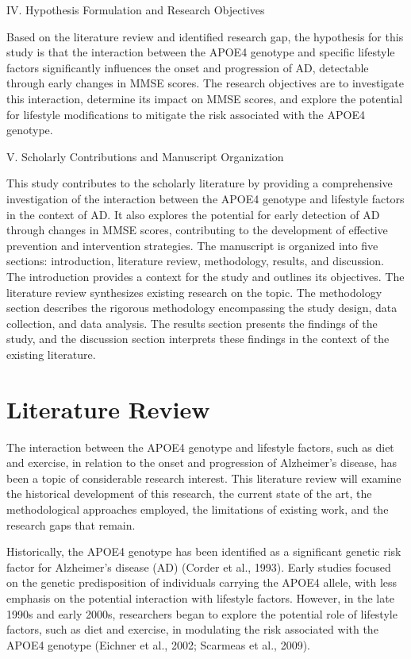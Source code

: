 \documentclass[conference]{IEEEtran}
\begin{document}
IV. Hypothesis Formulation and Research Objectives

Based on the literature review and identified research gap, the hypothesis for this study is that the interaction between the APOE4 genotype and specific lifestyle factors significantly influences the onset and progression of AD, detectable through early changes in MMSE scores. The research objectives are to investigate this interaction, determine its impact on MMSE scores, and explore the potential for lifestyle modifications to mitigate the risk associated with the APOE4 genotype.

V. Scholarly Contributions and Manuscript Organization

This study contributes to the scholarly literature by providing a comprehensive investigation of the interaction between the APOE4 genotype and lifestyle factors in the context of AD. It also explores the potential for early detection of AD through changes in MMSE scores, contributing to the development of effective prevention and intervention strategies. The manuscript is organized into five sections: introduction, literature review, methodology, results, and discussion. The introduction provides a context for the study and outlines its objectives. The literature review synthesizes existing research on the topic. The methodology section describes the rigorous methodology encompassing the study design, data collection, and data analysis. The results section presents the findings of the study, and the discussion section interprets these findings in the context of the existing literature.

\section{Literature Review}
The interaction between the APOE4 genotype and lifestyle factors, such as diet and exercise, in relation to the onset and progression of Alzheimer's disease, has been a topic of considerable research interest. This literature review will examine the historical development of this research, the current state of the art, the methodological approaches employed, the limitations of existing work, and the research gaps that remain.

Historically, the APOE4 genotype has been identified as a significant genetic risk factor for Alzheimer's disease (AD) (Corder et al., 1993). Early studies focused on the genetic predisposition of individuals carrying the APOE4 allele, with less emphasis on the potential interaction with lifestyle factors. However, in the late 1990s and early 2000s, researchers began to explore the potential role of lifestyle factors, such as diet and exercise, in modulating the risk associated with the APOE4 genotype (Eichner et al., 2002; Scarmeas et al., 2009).
\end{document}
